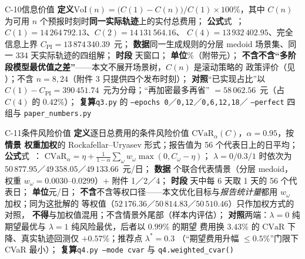 \begin{caliber}{C-10}{信息价值}
\textbf{定义}\quad \(\mathrm{VoI}(n)=\bigl(C(1)-C(n)\bigr)/C(1)\times100\%\)，其中 \(C(n)\) 为可用
\(n\) 个预报时刻时\textbf{同一实际轨迹}上的实付总费用；%
\textbf{公式}\quad 式~；\(C(1)=14\,264\,792.13\)、\(C(2)=14\,131\,564.16\)、
\(C(4)=13\,932\,402.95\)、完全信息上界 \(C_{\mathrm{PI}}=13\,874\,340.39\)~元；%
\textbf{数据}\quad 同一生成规则的分层 medoid 场景集、同一 334 天实际轨迹的四组解；%
\textbf{时段} 天窗口；%
\textbf{单位}\quad \%（附带元）；%
\textbf{不含}\quad \textbf{不含“多阶段模型最优值之差”}——本文不展开场景树，\(C(n)\) 是滚动策略的
政策评价（见 ）；不含 \(n=8,24\)（附件 3 只提供四个发布时刻）；%
\textbf{对照}\quad “已实现占比”以 \(C(1)-C_{\mathrm{PI}}=390\,451.74\)~元为分母；“再加密最多再省”
\(=58\,062.56\)~元（占 \(C(4)\) 的 \(0.42\%\)）；%
\textbf{复算}\quad \texttt{q3.py} 的 \texttt{--epochs 0}／\texttt{0,12}／\texttt{0,6,12,18}／
\texttt{--perfect} 四组与 \texttt{paper\_numbers.py}
\end{caliber}

\begin{caliber}{C-11}{条件风险价值}
\textbf{定义}\quad 逐日总费用的条件风险价值 \(\mathrm{CVaR}_\alpha(C)\)，\(\alpha=0.95\)，按\textbf{情景
权重加权}的 Rockafellar--Uryasev 形式；报告值为 56 个代表日上的日平均；%
\textbf{公式}\quad 式~：
\(\mathrm{CVaR}_\alpha=\eta+\frac{1}{1-\alpha}\sum_\omega w_\omega\max(0,C_\omega-\eta)\)；
\(\lambda=0/0.3/1\) 时依次为 \(50\,877.95\)／\(49\,358.05\)／\(49\,133.66\)~元/日；%
\textbf{数据} 个联合代表情景（分层 medoid，权重 \(w_\omega=0.0030\)--\(0.0299\)）\(+\)
附件 1／2／4；%
\textbf{时段} 天中每 6 天取 1 天的 56 个代表日；%
\textbf{单位}\quad 元/日；%
\textbf{不含}\quad 不含等权口径——本文优化目标与\emph{报告统计量}都用 \(w_\omega\) 加权；同为这批解的
等权值（\(52\,176.36\)／\(50\,814.83\)／\(50\,510.46\)）只作加权方式的对照，
\textbf{不得}与加权值混用；不含情景外尾部（样本内评估）；%
\textbf{对照}\quad 两端：\(\lambda=0\) 纯期望最优与 \(\lambda=1\) 纯风险最优，后者以 \(0.99\%\) 的期望
费用换 \(3.43\%\) 的 \(\mathrm{CVaR}\) 下降、真实轨迹回测仅 \(+0.57\%\)；推荐点 \(\lambda^{*}=0.3\)
（“期望费用升幅 \(\le0.5\%\)”门限下 CVaR 最小）；%
\textbf{复算}\quad \texttt{q4.py --mode cvar} 与 \texttt{q4.weighted\_cvar()}
\end{caliber}
